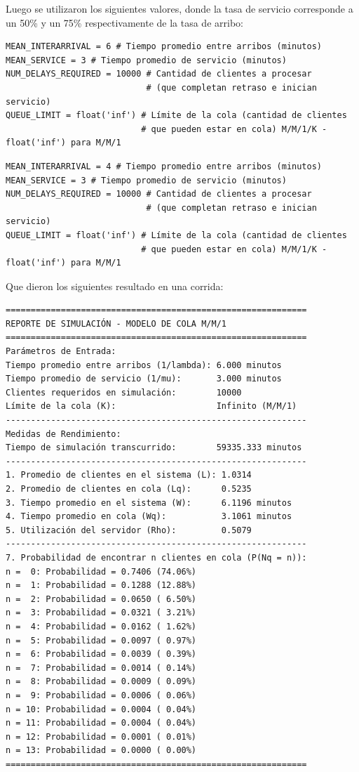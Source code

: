 \documentclass{article}
\begin{document}
Luego se utilizaron los siguientes valores, donde la tasa de servicio corresponde a un 50\% y un 75\% respectivamente de la tasa de arribo:

\begin{verbatim}
MEAN_INTERARRIVAL = 6 # Tiempo promedio entre arribos (minutos)
MEAN_SERVICE = 3 # Tiempo promedio de servicio (minutos)
NUM_DELAYS_REQUIRED = 10000 # Cantidad de clientes a procesar 
                            # (que completan retraso e inician servicio)
QUEUE_LIMIT = float('inf') # Límite de la cola (cantidad de clientes 
                           # que pueden estar en cola) M/M/1/K - float('inf') para M/M/1
\end{verbatim}

\begin{verbatim}
MEAN_INTERARRIVAL = 4 # Tiempo promedio entre arribos (minutos)
MEAN_SERVICE = 3 # Tiempo promedio de servicio (minutos)
NUM_DELAYS_REQUIRED = 10000 # Cantidad de clientes a procesar 
                            # (que completan retraso e inician servicio)
QUEUE_LIMIT = float('inf') # Límite de la cola (cantidad de clientes 
                           # que pueden estar en cola) M/M/1/K - float('inf') para M/M/1
\end{verbatim}

Que dieron los siguientes resultado en una corrida:

\begin{verbatim}
============================================================
REPORTE DE SIMULACIÓN - MODELO DE COLA M/M/1
============================================================
Parámetros de Entrada:
Tiempo promedio entre arribos (1/lambda): 6.000 minutos
Tiempo promedio de servicio (1/mu):       3.000 minutos
Clientes requeridos en simulación:        10000
Límite de la cola (K):                    Infinito (M/M/1)
------------------------------------------------------------
Medidas de Rendimiento:
Tiempo de simulación transcurrido:        59335.333 minutos
------------------------------------------------------------
1. Promedio de clientes en el sistema (L): 1.0314
2. Promedio de clientes en cola (Lq):      0.5235
3. Tiempo promedio en el sistema (W):      6.1196 minutos
4. Tiempo promedio en cola (Wq):           3.1061 minutos
5. Utilización del servidor (Rho):         0.5079
------------------------------------------------------------
7. Probabilidad de encontrar n clientes en cola (P(Nq = n)):
n =  0: Probabilidad = 0.7406 (74.06%)
n =  1: Probabilidad = 0.1288 (12.88%)
n =  2: Probabilidad = 0.0650 ( 6.50%)
n =  3: Probabilidad = 0.0321 ( 3.21%)
n =  4: Probabilidad = 0.0162 ( 1.62%)
n =  5: Probabilidad = 0.0097 ( 0.97%)
n =  6: Probabilidad = 0.0039 ( 0.39%)
n =  7: Probabilidad = 0.0014 ( 0.14%)
n =  8: Probabilidad = 0.0009 ( 0.09%)
n =  9: Probabilidad = 0.0006 ( 0.06%)
n = 10: Probabilidad = 0.0004 ( 0.04%)
n = 11: Probabilidad = 0.0004 ( 0.04%)
n = 12: Probabilidad = 0.0001 ( 0.01%)
n = 13: Probabilidad = 0.0000 ( 0.00%)
============================================================
\end{verbatim}
\end{document}
